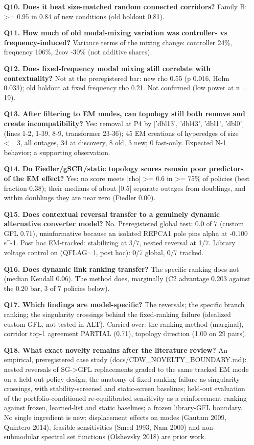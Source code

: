 \documentclass[10pt,a4paper]{article}
\begin{document}
\textbf{Q10. Does it beat size-matched random connected corridors?} Family B: >= 0.95 in 0.84 of new conditions (old holdout 0.81).

\textbf{Q11. How much of old modal-mixing variation was controller- vs frequency-induced?} Variance terms of the mixing change: controller 24\%, frequency 106\%, 2cov -30\% (not additive shares).

\textbf{Q12. Does fixed-frequency modal mixing still correlate with contextuality?} Not at the preregistered bar: new rho 0.55 (p 0.016, Holm 0.033); old holdout at fixed frequency rho 0.21. Not confirmed (low power at n = 19).

\textbf{Q13. After filtering to EM modes, can topology still both remove and create incompatibility?} Yes: removal at P4 by ['dbl13', 'dbl43', 'dbl1', 'dbl0'] (lines 1-2, 1-39, 8-9, transformer 23-36); 45 EM creations of hyperedges of size <= 3, all outages, 34 at discovery, 8 old, 3 new; 0 fast-only. Expected N-1 behavior; a supporting observation.

\textbf{Q14. Do Fiedler/gSCR/static topology scores remain poor predictors of the EM effect?} Yes: no score meets |rho| >= 0.6 in >= 75\% of policies (best fraction 0.38); their medians of about |0.5| separate outages from doublings, and within doublings they are near zero (Fiedler 0.00).

\textbf{Q15. Does contextual reversal transfer to a genuinely dynamic alternative converter model?} No. Preregistered global test: 0.0 of 7 (custom GFL 0.71), uninformative because an isolated REPCA1 pole pins alpha at -0.100 s\textasciicircum{}-1. Post hoc EM-tracked: stabilizing at 3/7, nested reversal at 1/7. Library voltage control on (QFLAG=1, post hoc): 0/7 global, 0/7 tracked.

\textbf{Q16. Does dynamic link ranking transfer?} The specific ranking does not (median Kendall 0.06). The method does, marginally (C2 advantage 0.203 against the 0.20 bar, 3 of 7 policies below).

\textbf{Q17. Which findings are model-specific?} The reversals; the specific branch ranking; the singularity crossings behind the fixed-ranking failure (idealized custom GFL, not tested in ALT). Carried over: the ranking method (marginal), corridor top-1 agreement PARTIAL (0.71), topology direction (1.00 on 29 pairs).

\textbf{Q18. What exact novelty remains after the literature review?} An empirical, preregistered case study (docs/CDW\_NOVELTY\_BOUNDARY.md): nested reversals of SG->GFL replacements graded to the same tracked EM mode on a held-out policy design; the anatomy of fixed-ranking failure as singularity crossings, with stability-screened and static-screen baselines; held-out evaluation of the portfolio-conditioned re-equilibrated sensitivity as a reinforcement ranking against frozen, learned-list and static baselines; a frozen library-GFL boundary. No single ingredient is new; displacement effects on modes (Gautam 2009, Quintero 2014), feasible sensitivities (Smed 1993, Nam 2000) and non-submodular spectral set functions (Olshevsky 2018) are prior work.
\end{document}
